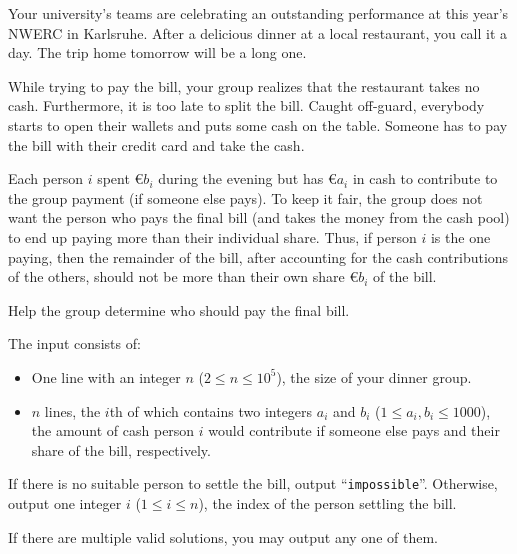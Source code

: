 

\newcommand{\maxn}{10^5}
\newcommand{\maxx}{1000}

Your university's teams are celebrating an outstanding performance at this year's NWERC in Karlsruhe.
After a delicious dinner at a local restaurant, you call it a day.
The trip home tomorrow will be a long one.

While trying to pay the bill, your group realizes that the restaurant takes no cash.
Furthermore, it is too late to split the bill.
Caught off-guard, everybody starts to open their wallets and puts some cash on the table.
Someone has to pay the bill with their credit card and take the cash.

Each person $i$ spent €$b_i$ during the evening but has €$a_i$ in cash to contribute to the group payment (if someone else pays).
To keep it fair, the group does not want the person who pays the final bill (and takes the money from the cash pool) to end up paying more than their individual share.
Thus, if person $i$ is the one paying, then the remainder of the bill, after
accounting for the cash contributions of the others, should not be more than their own share €$b_i$ of the bill.

Help the group determine who should pay the final bill.



\begin{Input}
    The input consists of:
    \begin{itemize}
        \item One line with an integer $n$ ($2 \leq n \leq \maxn$), the size of your dinner group.
        \item $n$ lines, the $i$th of which contains two integers $a_i$ and $b_i$ ($1 \leq a_i, b_i \leq \maxx$), the amount of cash person $i$ would contribute if someone else pays and their share of the bill, respectively.
    \end{itemize}
\end{Input}

\begin{Output}
    If there is no suitable person to settle the bill, output ``\texttt{impossible}''.
    Otherwise, output one integer $i$ ($1 \leq i \leq n$), the index of the person settling the bill.

    If there are multiple valid solutions, you may output any one of them.
\end{Output}

